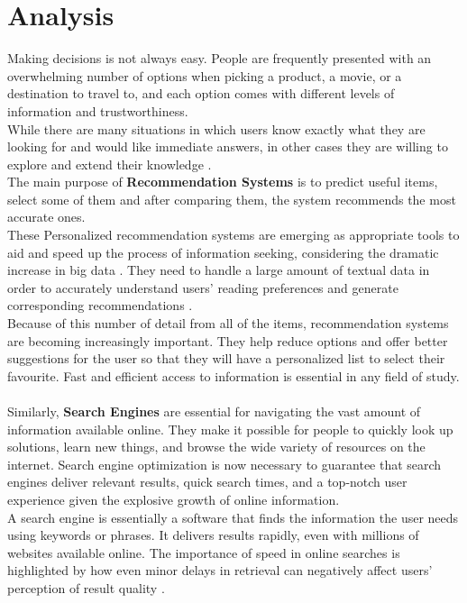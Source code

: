 \documentclass[\myFontSize,oneside,english,hidelinks,a4paper]{article}
\begin{document}
\section{Analysis}
Making decisions is not always easy. People are frequently presented with an overwhelming number of options when picking a product, a movie, or a destination to travel to, and each option comes with different levels of information and trustworthiness. \\
While there are many situations in which users know exactly what they are looking for and would like immediate answers, in other cases they are willing to explore and extend their knowledge \cite{Blanco201333}.\\
The main purpose of \textbf{Recommendation Systems} is to predict useful items, select some of them and after comparing them, the system recommends the most accurate ones.\\ 
These Personalized recommendation systems are emerging as appropriate tools to aid and speed up the process of information seeking, considering the dramatic increase in big data \cite{Haruna2017}. They need to handle a large amount of textual data in order to accurately understand users’ reading preferences and generate corresponding recommendations \cite{Yan2024}. \\
%
Because of this number of detail from all of the items, recommendation systems are becoming increasingly important. They help reduce options and offer better suggestions for the user so that they will have a personalized list to select their favourite. Fast and efficient access to information is essential in any field of study. \\\\
%
Similarly, \textbf{Search Engines} are essential for navigating the vast amount of information available online. They make it possible for people to quickly look up solutions, learn new things, and browse the wide variety of resources on the internet. Search engine optimization is now necessary to guarantee that search engines deliver relevant results, quick search times, and a top-notch user experience given the explosive growth of online information.\\
A search engine is essentially a software that finds the information the user needs using keywords or phrases. It delivers results rapidly, even with millions of websites available online.
The importance of speed in online searches is highlighted by how even minor delays in retrieval can negatively affect users' perception of result quality \cite{pub.1171882357}.\\
\end{document}
